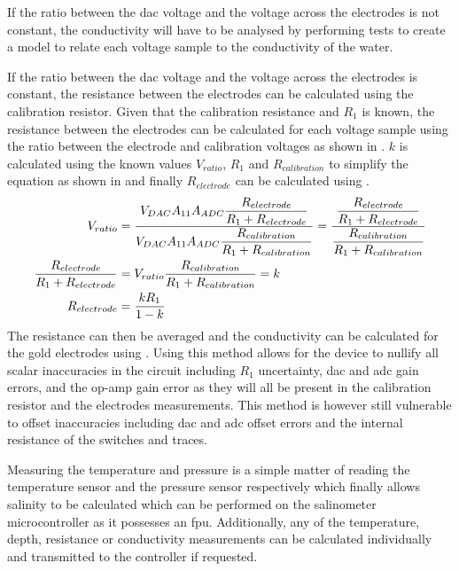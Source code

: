 If the ratio between the \gls{dac} voltage and the voltage across the electrodes is not constant, the conductivity will have to be analysed by performing tests to create a model to relate each voltage sample to the conductivity of the water.

If the ratio between the \gls{dac} voltage and the voltage across the electrodes is constant, the resistance between the electrodes can be calculated using the calibration resistor.
Given that the calibration resistance and $R_1$ is known, the resistance between the electrodes can be calculated for each voltage sample using the ratio between the electrode and calibration voltages as shown in .
$k$ is calculated using the known values $V_{ratio}$, $R_1$ and $R_{calibration}$ to simplify the equation as shown in  and finally $R_{electrode}$ can be calculated using .
\begin{align}
    V_{ratio} &= \frac{\displaystyle V_{DAC}A_{11}A_{ADC}\frac{\displaystyle R_{electrode}}{\displaystyle R_1 + R_{electrode}}}{\displaystyle V_{DAC}A_{11}A_{ADC}\frac{\displaystyle R_{calibration}}{\displaystyle R_1 + R_{calibration}}} = \frac{\displaystyle \frac{\displaystyle R_{electrode}}{\displaystyle R_1 + R_{electrode}}}{\displaystyle \frac{\displaystyle R_{calibration}}{\displaystyle R_1 + R_{calibration}}} \label{eqn:electrode-calib-resistance} \\
    \frac{\displaystyle R_{electrode}}{\displaystyle R_1 + R_{electrode}} &= V_{ratio} \frac{\displaystyle R_{calibration}}{\displaystyle R_1 + R_{calibration}} = k \label{eqn:electrode-calib-resistance-simplified} \\
    R_{electrode} &= \frac{\displaystyle kR_1}{\displaystyle 1 - k} \label{eqn:electrode-calib-resistance-final}
\end{align}
The resistance can then be averaged and the conductivity can be calculated for the gold electrodes using .
Using this method allows for the device to nullify all scalar inaccuracies in the circuit including $R_1$ uncertainty, \gls{dac} and \gls{adc} gain errors, and the op-amp gain error as they will all be present in the calibration resistor and the electrodes measurements.
This method is however still vulnerable to offset inaccuracies including \gls{dac} and \gls{adc} offset errors and the internal resistance of the switches and traces.

Measuring the temperature and pressure is a simple matter of reading the temperature sensor and the pressure sensor respectively which finally allows salinity to be calculated which can be performed on the salinometer microcontroller as it possesses an \gls{fpu}.
Additionally, any of the temperature, depth, resistance or conductivity measurements can be calculated individually and transmitted to the controller if requested.

